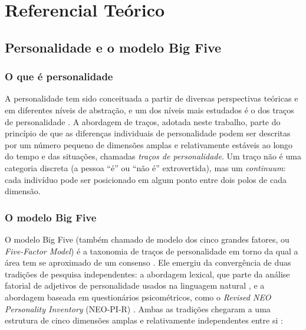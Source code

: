 \chapter{Referencial Teórico}
\label{cap:referencial}

\section{Personalidade e o modelo Big Five}

\subsection{O que é personalidade}

A personalidade tem sido conceituada a partir de diversas perspectivas
teóricas e em diferentes níveis de abstração, e um dos níveis mais
estudados é o dos traços de personalidade \cite{johnsrivastava1999}. A
abordagem de traços, adotada neste trabalho, parte do princípio de que as
diferenças individuais de personalidade podem ser descritas por um número
pequeno de dimensões amplas e relativamente estáveis ao longo do tempo e
das situações, chamadas \textit{traços de personalidade}. Um traço não é
uma categoria discreta (a pessoa ``é'' ou ``não é'' extrovertida), mas um
\textit{continuum}: cada indivíduo pode ser posicionado em algum ponto
entre dois polos de cada dimensão.

\subsection{O modelo Big Five}

O modelo Big Five (também chamado de modelo dos cinco grandes fatores, ou
\textit{Five-Factor Model}) é a taxonomia de traços de personalidade em
torno da qual a área tem se aproximado de um consenso
\cite{johnsrivastava1999}. Ele emergiu da convergência de duas tradições
de pesquisa independentes: a abordagem lexical, que parte da análise
fatorial de adjetivos de personalidade usados na linguagem natural
\cite{goldberg1990}, e a abordagem baseada em questionários
psicométricos, como o \textit{Revised NEO Personality Inventory}
(NEO-PI-R) \cite{costamccrae1992}. Ambas as tradições chegaram a uma
estrutura de cinco dimensões amplas e relativamente independentes entre
si \cite{johnsrivastava1999}:


